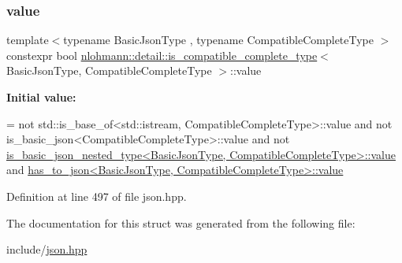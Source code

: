 \subsubsection{\texorpdfstring{value}{value}}
{\footnotesize\ttfamily template$<$typename Basic\+Json\+Type , typename Compatible\+Complete\+Type $>$ \\
constexpr bool \hyperlink{structnlohmann_1_1detail_1_1is__compatible__complete__type}{nlohmann\+::detail\+::is\+\_\+compatible\+\_\+complete\+\_\+type}$<$ Basic\+Json\+Type, Compatible\+Complete\+Type $>$\+::value\hspace{0.3cm}{\ttfamily [static]}}

{\bfseries Initial value\+:}
\begin{DoxyCode}
=
        not std::is\_base\_of<std::istream, CompatibleCompleteType>::value and
        not is\_basic\_json<CompatibleCompleteType>::value and
        not 
      \hyperlink{structnlohmann_1_1detail_1_1is__basic__json__nested__type_aee5fee744e5298a78d557f2ee5f090db}{is\_basic\_json\_nested\_type<BasicJsonType, CompatibleCompleteType>::value}
       and
        \hyperlink{structnlohmann_1_1detail_1_1has__to__json_a18e260c3c6f10328637c4427d3cb3a31}{has\_to\_json<BasicJsonType, CompatibleCompleteType>::value}
\end{DoxyCode}


Definition at line 497 of file json.\+hpp.



The documentation for this struct was generated from the following file\+:\begin{DoxyCompactItemize}
\item 
include/\hyperlink{json_8hpp}{json.\+hpp}\end{DoxyCompactItemize}
